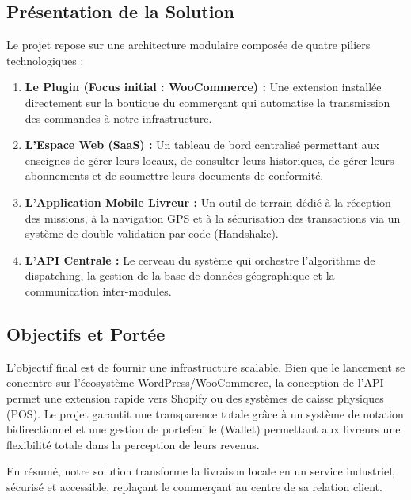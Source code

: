 \subsection{Présentation de la Solution}
Le projet repose sur une architecture modulaire composée de quatre piliers technologiques :
\begin{enumerate}
    \item \textbf{Le Plugin (Focus initial : WooCommerce) :} Une extension installée directement sur la boutique du commerçant qui automatise la transmission des commandes à notre infrastructure.
    \item \textbf{L'Espace Web (SaaS) :} Un tableau de bord centralisé permettant aux enseignes de gérer leurs locaux, de consulter leurs historiques, de gérer leurs abonnements et de soumettre leurs documents de conformité.
    \item \textbf{L'Application Mobile Livreur :} Un outil de terrain dédié à la réception des missions, à la navigation GPS et à la sécurisation des transactions via un système de double validation par code (Handshake).
    \item \textbf{L'API Centrale :} Le cerveau du système qui orchestre l'algorithme de dispatching, la gestion de la base de données géographique et la communication inter-modules.
\end{enumerate}

\subsection{Objectifs et Portée}
L'objectif final est de fournir une infrastructure scalable. Bien que le lancement se concentre sur l'écosystème WordPress/WooCommerce, la conception de l'API permet une extension rapide vers Shopify ou des systèmes de caisse physiques (POS). Le projet garantit une transparence totale grâce à un système de notation bidirectionnel et une gestion de portefeuille (Wallet) permettant aux livreurs une flexibilité totale dans la perception de leurs revenus.

En résumé, notre solution transforme la livraison locale en un service industriel, sécurisé et accessible, replaçant le commerçant au centre de sa relation client.











